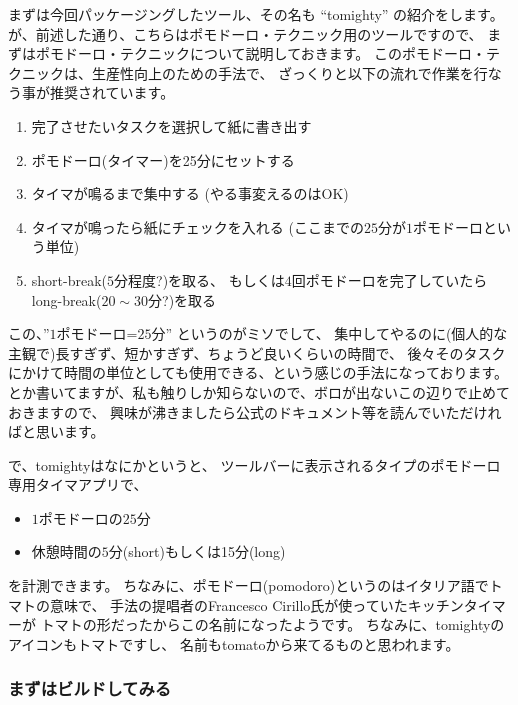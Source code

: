 \documentclass[mingoth,a4paper]{jsarticle}
\begin{document}
まずは今回パッケージングしたツール、その名も ``tomighty'' の紹介をします。
が、前述した通り、こちらはポモドーロ・テクニック用のツールですので、
まずはポモドーロ・テクニックについて説明しておきます。
このポモドーロ・テクニックは、生産性向上のための手法で、
ざっくりと以下の流れで作業を行なう事が推奨されています。
\begin{enumerate}
 \item 完了させたいタスクを選択して紙に書き出す
 \item ポモドーロ(タイマー)を25分にセットする
 \item タイマが鳴るまで集中する (やる事変えるのはOK)
 \item タイマが鳴ったら紙にチェックを入れる (ここまでの$25$分が$1$ポモドーロという単位)
 \item short-break($5$分程度?)を取る、
   もしくは$4$回ポモドーロを完了していたらlong-break($20\sim 30$分?)を取る
\end{enumerate}
この、''$1$ポモドーロ=$25$分'' というのがミソでして、
集中してやるのに(個人的な主観で)長すぎず、短かすぎず、ちょうど良いくらいの時間で、
後々そのタスクにかけて時間の単位としても使用できる、という感じの手法になっております。
とか書いてますが、私も触りしか知らないので、ボロが出ないこの辺りで止めておきますので、
興味が沸きましたら公式のドキュメント等を読んでいただければと思います。

で、tomightyはなにかというと、
ツールバーに表示されるタイプのポモドーロ専用タイマアプリで、
\begin{itemize}
 \item $1$ポモドーロの$25$分
 \item 休憩時間の$5$分(short)もしくは15分(long)
\end{itemize}
を計測できます。
ちなみに、ポモドーロ(pomodoro)というのはイタリア語でトマトの意味で、
手法の提唱者のFrancesco Cirillo氏が使っていたキッチンタイマーが
トマトの形だったからこの名前になったようです。
ちなみに、tomightyのアイコンもトマトですし、
名前もtomatoから来てるものと思われます。

\subsubsection{まずはビルドしてみる}
\end{document}
